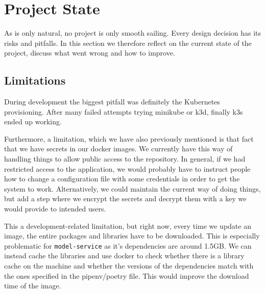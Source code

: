 
\section{Project State}
As is only natural, no project is only smooth sailing. Every design decision has its risks and pitfalls. In this section we therefore reflect on the current state of the project, discuss what went wrong and how to improve.
\subsection{Limitations}
During development the biggest pitfall was definitely the Kubernetes provisioning. After many failed attempts trying minikube or k3d, finally k3s ended up working.

Furthermore, a limitation, which we have also previously mentioned is that fact that we have secrets in our docker images. We currently have this way of handling things to allow public access to the repository. In general, if we had restricted access to the application, we would probably have to instruct people how to change a configuration file with some credentials in order to get the system to work. Alternatively, we could maintain the current way of doing things, but add a step where we encrypt the secrets and decrypt them with a key we would provide to intended users.

This a development-related limitation, but right now, every time we update an image, the entire packages and libraries have to be downloaded. This is especially problematic for \texttt{model-service} as it's dependencies are around 1.5GB. We can instead cache the libraries and use docker to check whether there is a library cache on the machine and whether the versions of the dependencies match with the ones specified in the pipenv/poetry file. This would improve the download time of the image.

